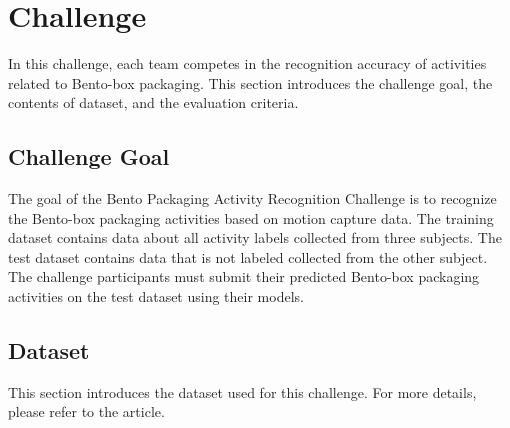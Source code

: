 \documentclass[graybox]{svmult}
\begin{document}
\section{Challenge}
\label{sec:challenge}
In this challenge, each team competes in the recognition accuracy of activities related to Bento-box packaging. This section introduces the challenge goal, the contents of dataset, and the evaluation criteria.


\subsection{Challenge Goal}
The goal of the Bento Packaging Activity Recognition Challenge is to recognize the Bento-box packaging activities based on motion capture data.
The training dataset contains data about all activity labels collected from three subjects. The test dataset contains data that is not labeled collected from the other subject. The challenge participants must submit their predicted Bento-box packaging activities on the test dataset using their models.

\subsection{Dataset}
\label{subsec:dataset}
This section introduces the dataset used for this challenge. For more details, please refer to the article\cite{ex1}.
\end{document}
